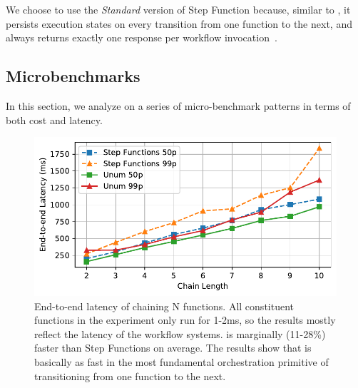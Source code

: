 We choose to use the \emph{Standard} version of Step Function because, similar
to \name{}, it persists execution states on every transition from one function
to the next, and always returns exactly one response per workflow
invocation~\cite{aws-step-functions-exec-gntee}.




\subsection{Microbenchmarks}\label{sec:eval:micro}

In this section, we analyze \name{} on a series of micro-benchmark patterns in
terms of both cost and latency.

\begin{figure}[t!]
  \centering
  \includegraphics[width=\columnwidth]{figures/ChainMicroLatency.pdf}
  \caption{End-to-end latency of chaining N functions. All constituent
    functions in the experiment only run for 1-2ms, so the results mostly
    reflect the latency of the workflow systems. \name{} is marginally
    (11-28\%) faster than Step Functions on average. The results show that
    \name{} is basically as fast in the most fundamental orchestration
    primitive of transitioning from one function to the next.}
  \label{fig:chainmicrolatency}
\end{figure}

